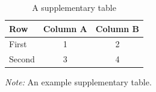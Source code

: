 \documentclass[
    fontsize=12pt,DIV=10,fleqn,
    letterpaper,oneside,paper=portrait,
]{scrartcl}
\begin{document}
\begin{table}[h]\centering
  \begin{threeparttable}
    \caption{A supplementary table\label{tbl:supp-example}}
    \begin{tabular}{lcc}
    \toprule
    Row & Column A & Column B \\
    \midrule
    First  & 1 & 2 \\
    Second & 3 & 4 \\
    \bottomrule
    \end{tabular}
    \begin{tablenotes}\footnotesize
      \emph{Note:} An example supplementary table.
    \end{tablenotes}
  \end{threeparttable}
\end{table}
\end{document}
